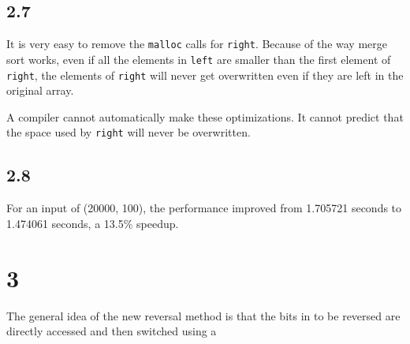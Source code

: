 \documentclass[12pt]{article}
\begin{document}
\subsection{2.7}
It is very easy to remove the {\tt malloc} calls for {\tt right}. Because of the way merge sort works, even if
all the elements in {\tt left} are smaller than the first element of {\tt right}, the elements of {\tt right}
will never get overwritten even if they are left in the original array.

A compiler cannot automatically make these optimizations. It cannot predict that the space used by {\tt right}
will never be overwritten.

\subsection{2.8}
For an input of (20000, 100), the performance improved from 1.705721 seconds to 1.474061 seconds, a 13.5\%
speedup.

\section{3}
The general idea of the new reversal method is that the bits in to be reversed
are directly accessed and then switched using a 
\end{document}
